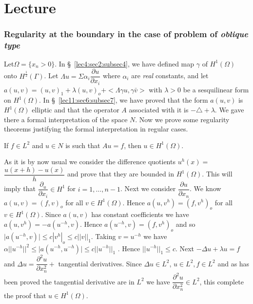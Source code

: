 \chapter{Lecture}\label{lec18}%
\setcounter{section}{9}

\subsection[Regularity at the boundary in the case of...]{Regularity at the boundary in the case of problem of\hfil\break
  \textit{oblique type}}\label{lec18:sec9:subsec8}   

Let\pageoriginale $\Omega = \{ x_n > 0 \}$. In \S\ \ref{lec4:sec2:subsec4}, we have defined map
$\gamma$ of $H^1 (\Omega )$ onto $H^{\frac{1}{2}}( \Gamma )$. Let
$\Lambda u = \Sigma \alpha_i \dfrac{\partial u}{\partial x_i}$ where
$\alpha_i$ are \textit{real} constants, and let $a(u, v) = (u, v)_1 +
\lambda (u, v)_o + < \Lambda \gamma u, \gamma \bar{v} >$ with $\lambda
> 0$ be a sesquilinear form on $H^1 (\Omega )$. In \S\  \ref{lec11:sec6:subsec7}, we have
proved that the form $a(u, v)$ is $H^1 (\Omega )$ elliptic and that
the operator $A$ associated with it is $-\triangle + \lambda$. We gave
there a formal interpretation of the space $N$. Now we prove some
regularity theorems justifying the formal interpretation in regular
cases.
  
\begin{theorem}\label{lec18:sec9:subsec8:thm9.4}%
  If $f \in L^2$ and $u \in N$ is such that $Au = f$,
  then $u \in H^1 (\Omega )$.  
\end{theorem}

As it is by now usual we consider the difference quotients $u^h (x)
=$\break  
$\dfrac{u(x + h) - u (x)}{h}$ and prove that they are bounded in $H^1
(\Omega )$. This will imply that $\dfrac{\partial_u}{\partial x_i} \in
H^1$
for $i = 1, \ldots , n-1$. Next we consider $\dfrac{\partial
  u}{\partial x_n}$. We know $a(u, v) = (f, v)_o$ for all $v
\in H^1 (\Omega )$. Hence $a(u, v^h) = (f, v^h)_o$ for all $v
\in H^1 (\Omega )$. Since $a (u, v)$ has constant coefficients
we have $a(u, v^h) = -a (u^{-h}, v)$. Hence $a(u^{-h}, v) = (f,
v^h)_o$ and so $\big| a (u^{-h}, v) \big| \leq c | v^h |_o \leq c || v
||_1$. Taking $v = u^{-h}$ we have $\alpha || u^{-h}||^2 \leq
\big| a(u^{-h}, u^{-h}) \big| \leq c || u^{-h} ||_1$ . Hence $||
u^{-h} ||_1 \leq c$. Next $- \Delta u + \lambda u = f $ and $\Delta u
= \dfrac{\partial^2 u}{\partial x^2_n} + $ tangential
derivatives. Since $\Delta u \in L^2$, $u \in  L^2 , f \in
L^2$ and as has been proved the tangential derivative are in $L^2$ we
have $\dfrac{\partial^2 u}{\partial x^2_n} \in L^2$, this
complete the proof that $u \in H^1 (\Omega )$.  

